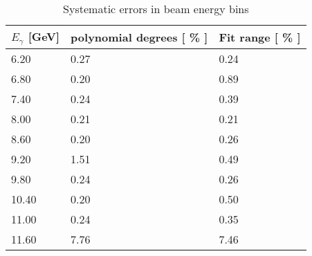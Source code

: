 \documentclass[12pt]{extarticle}
\begin{document}
 \begin{table}[!htbp]
 \begin{minipage}{\textwidth}
 \begin{center}
 \caption{Systematic errors in beam energy bins}
 \begin{tabularx}{\textwidth}{|X|X|X|}
 \hline
 $E_{\gamma}$ [GeV] & polynomial degrees [ \% ] & Fit range [ \% ]  \\ 
 \hline
6.20 & 0.27 & 0.24 \\ 
6.80 & 0.20 & 0.89 \\ 
7.40 & 0.24 & 0.39 \\ 
8.00 & 0.21 & 0.21 \\ 
8.60 & 0.20 & 0.26 \\ 
9.20 & 1.51 & 0.49 \\ 
9.80 & 0.24 & 0.26 \\ 
10.40 & 0.20 & 0.50 \\ 
11.00 & 0.24 & 0.35 \\ 
11.60 & 7.76 & 7.46 \\ 
\hline
 \end{tabularx}
 \end{center}
 \end{minipage}
 \end{table}
 
\end{document}
